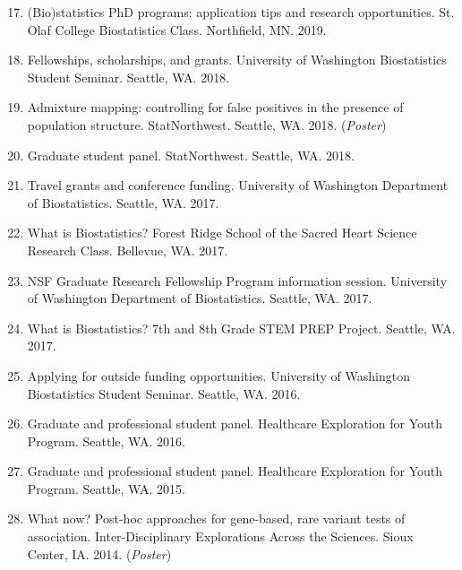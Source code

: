 \documentclass[margin]{res}
\newenvironment{benumerate}[1]{
    \let\oldItem\item
    \def\item{\addtocounter{enumi}{-2}\oldItem}
    
    \begin{enumerate}
    \setcounter{enumi}{#1}
    \addtocounter{enumi}{1}
}{
    \end{enumerate}
}
\begin{document}
\begin{resume}
\begin{benumerate}{16}
\item (Bio)statistics PhD programs: application tips and research opportunities. St. Olaf College Biostatistics Class. Northfield, MN. 2019.

\item Fellowships, scholarships, and grants. University of Washington Biostatistics Student Seminar. Seattle, WA. 2018.

\item %
Admixture mapping: controlling for false positives in the presence of population structure. StatNorthwest. Seattle, WA. 2018. (\textit{Poster})

\item Graduate student panel. StatNorthwest. Seattle, WA. 2018.

\item %
Travel grants and conference funding. University of Washington Department of Biostatistics. Seattle, WA. 2017.

\item %
What is Biostatistics? Forest Ridge School of the Sacred Heart Science Research Class. Bellevue, WA. 2017.

\item %
NSF Graduate Research Fellowship Program information session. University of Washington Department of Biostatistics. Seattle, WA. 2017.

\item %
What is Biostatistics? 7th and 8th Grade STEM PREP Project. Seattle, WA. 2017. %

\item %
Applying for outside funding opportunities. University of Washington Biostatistics Student Seminar. Seattle, WA. 2016.

\item Graduate and professional student panel. Healthcare Exploration for Youth Program. Seattle, WA. 2016.

\item Graduate and professional student panel. Healthcare Exploration for Youth Program. Seattle, WA. 2015.

\item %
What now? Post-hoc approaches for gene-based, rare variant tests of association. Inter-Disciplinary Explorations Across the Sciences. Sioux Center, IA. 2014.  (\textit{Poster})\\
\end{benumerate}


\end{resume}
\end{document}
